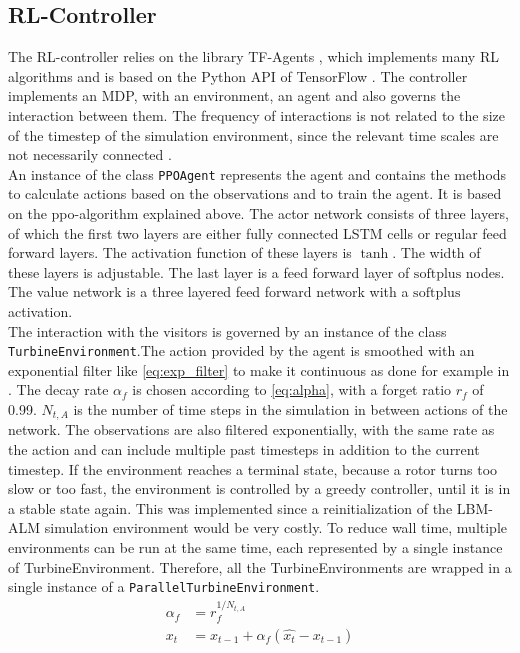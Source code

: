\subsection{RL-Controller}
The RL-controller relies on the library TF-Agents \cite{guadarrama_tf-agents_2018}, which implements many RL algorithms and is based on the Python API of TensorFlow \cite{abadi_tensorflow_2015}. The controller implements an MDP, with an environment, an agent and also governs the interaction between them. The frequency of interactions is not related to the size of the timestep of the simulation environment, since the relevant time scales are not necessarily connected \cite{rabault_deep_2018-1}. \\
An instance of the class \texttt{PPOAgent} represents the agent and contains the methods to calculate actions based on the observations and to train the agent. It is based on the ppo-algorithm explained above. The actor network consists of three layers, of which the first two layers are either fully connected LSTM cells or regular feed forward layers. The activation function of these layers is $\tanh$. The width of these layers is adjustable. The last layer is a feed forward layer of $\mathrm{softplus}$ nodes. The value network is a three layered feed forward network with a $\mathrm{softplus}$ activation. \\
The interaction with the visitors is governed by an instance of the class \texttt{TurbineEnvironment}.The action provided by the agent is smoothed with an exponential filter like \eqref{eq:exp_filter} to make it continuous as done for example in \cite{rabault_deep_2018-1}. The decay rate $\alpha_f$ is chosen according to \eqref{eq:alpha}, with a forget ratio $r_f$ of \SI{0.99}{}. $N_{t,A}$ is the number of time steps in the simulation in between actions of the network. The observations are also filtered exponentially, with the same rate as the action and can include multiple past timesteps in addition to the current timestep. If the environment reaches a terminal state, because a rotor turns too slow or too fast, the environment is controlled by a greedy controller, until it is in a stable state again. This was implemented since a reinitialization of the LBM-ALM simulation environment would be very costly. To reduce wall time, multiple environments can be run at the same time, each represented by a single instance of TurbineEnvironment. Therefore, all the TurbineEnvironments are wrapped in a single instance of a \texttt{ParallelTurbineEnvironment}. \\
\begin{align}
	\alpha_f &= r_f^{1/N_{t,A}} \label{eq:alpha}\\
	x_t &= x_{t-1} + \alpha_f(\hat{x_t} - x_{t-1}) \label{eq:exp_filter}
\end{align}
